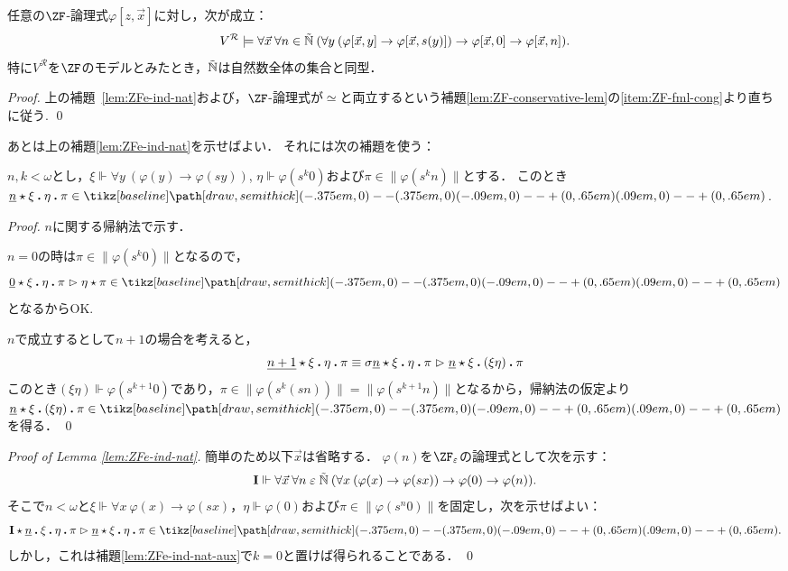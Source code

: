 \documentclass[realisability.tex]{subfiles}
\begin{document}
\begin{corollary}
 任意の$\ZF$-論理式$\varphi[z, \vec{x}]$に対し，次が成立：
 \[
  V^{\mathcal{R}} \models \forall \vec{x}\: \forall n \in \mathord{\tilde{\mathbb{N}}} \:(\forall y\: (\varphi[\vec{x}, y] \to \varphi[\vec{x}, s(y)]) \to \varphi[\vec{x}, 0] \to \varphi[\vec{x}, n]).
 \]
 特に$V^{\mathcal{R}}$を$\ZF$のモデルとみたとき，$\mathord{\tilde{\mathbb{N}}}$は自然数全体の集合と同型．
\end{corollary}
\begin{proof}
 上の補題~\ref{lem:ZFe-ind-nat}および，$\ZF$-論理式が$\simeq$と両立するという補題\ref{lem:ZF-conservative-lem}の\ref{item:ZF-fml-cong}より直ちに従う. \qed
\end{proof}
あとは上の補題\ref{lem:ZFe-ind-nat}を示せばよい．
それには次の補題を使う：
\begin{lemma}\label{lem:ZFe-ind-nat-aux}
 $n, k < \omega$とし，$\xi \Vdash \forall y\: (\varphi(y) \to \varphi(s y))$, $\eta \Vdash \varphi(s^k 0)$および$\pi \in \|\varphi(s^k n)\|$とする．
 このとき$\KVM{{{\num n}} \xi \eta \pi} \in \pole$.
\end{lemma}
\begin{proof}
 $n$に関する帰納法で示す．

 $n = 0$の時は$\pi \in \|\varphi(s^k 0)\|$となるので，
 \[
  \KVM{{{\num 0}} \xi \eta \pi} \redsto \KVM{\eta \pi} \in \pole
 \]
 となるからOK.

 $n$で成立するとして$n + 1$の場合を考えると，
 \[
  \KVM{{{\num{n+1}}} \xi \eta \pi} \equiv
  \KVM{{\sigma \num{n}} \xi \eta \pi} \redsto
  \KVM{{{\num{n}}} \xi {(\xi \eta)} \pi}
 \]
 このとき$(\xi\eta) \Vdash \varphi(s^{k+1} 0)$であり，$\pi \in \|\varphi(s^k(s n))\| = \|\varphi(s^{k+1} n)\|$となるから，帰納法の仮定より$\KVM{{{\num{n}}} \xi {(\xi \eta)} \pi} \in \pole$を得る． \qed
\end{proof}

\begin{proof}[Proof of Lemma \ref{lem:ZFe-ind-nat}]
 簡単のため以下$\vec{x}$は省略する．
 $\varphi(n)$を$\ZF_{\varepsilon}$の論理式として次を示す：
  \[
  \mathsf{\mathbf{I}} \Vdash \forall \vec{x}\: \forall n \mathrel{\varepsilon} \mathord{\tilde{\mathbb{N}}} \:(\forall x\: (\varphi(x) \to \varphi(sx)) \to \varphi(0) \to \varphi(n)).
 \]
 そこで$n < \omega$と$\xi \Vdash \forall x \: \varphi(x) \to \varphi(s x)$，$\eta \Vdash \varphi(0)$および$\pi \in \|\varphi(s^n 0)\|$を固定し，次を示せばよい：
 \[
  \KVM{{\I}{{\num{n}}} \xi\eta {\pi}} \redsto
  \KVM{{{\num{n}}} \xi \eta \pi} \in \pole.
 \]
 しかし，これは補題\ref{lem:ZFe-ind-nat-aux}で$k = 0$と置けば得られることである． \qed
\end{proof}
\end{document}
